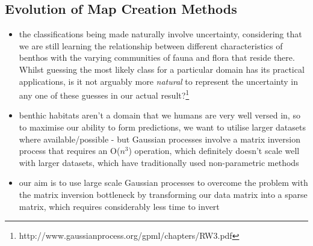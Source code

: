 \documentclass[12pt]{article}
\begin{document}
\begin{multicols}{2}
            \section{Evolution of Map Creation Methods}
            \begin{itemize}
                \item the classifications being made naturally involve uncertainty, considering that we are still learning the relationship between different characteristics of benthos with the varying communities of fauna and flora that reside there. Whilst guessing the most likely class for a particular domain has its practical applications, is it not arguably more \textit{natural} to represent the uncertainty in any one of these guesses in our actual result?\footnote{http://www.gaussianprocess.org/gpml/chapters/RW3.pdf}
                \item benthic habitats aren't a domain that we humans are very well versed in, so to maximise our ability to form predictions, we want to utilise larger datasets where available/possible - but Gaussian processes involve a matrix inversion process that requires an O($n^3$) operation, which definitely doesn't scale well with larger datasets, which have traditionally used non-parametric methods
                \item our aim is to use large scale Gaussian processes to overcome the problem with the matrix inversion bottleneck by transforming our data matrix into a sparse matrix, which requires considerably less time to invert
            \end{itemize}
            


\end{multicols}
\end{document}

